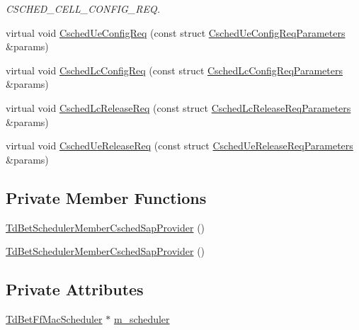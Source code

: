 \begin{DoxyCompactItemize}
\begin{DoxyCompactList}\small\item\em C\+S\+C\+H\+E\+D\+\_\+\+C\+E\+L\+L\+\_\+\+C\+O\+N\+F\+I\+G\+\_\+\+R\+EQ. \end{DoxyCompactList}\item 
virtual void \hyperlink{classns3_1_1TdBetSchedulerMemberCschedSapProvider_a410a8241454ffd4e73bf6f1985e3cb11}{Csched\+Ue\+Config\+Req} (const struct \hyperlink{structns3_1_1FfMacCschedSapProvider_1_1CschedUeConfigReqParameters}{Csched\+Ue\+Config\+Req\+Parameters} \&params)
\item 
virtual void \hyperlink{classns3_1_1TdBetSchedulerMemberCschedSapProvider_a5de5df46385608870900ff14f85d7895}{Csched\+Lc\+Config\+Req} (const struct \hyperlink{structns3_1_1FfMacCschedSapProvider_1_1CschedLcConfigReqParameters}{Csched\+Lc\+Config\+Req\+Parameters} \&params)
\item 
virtual void \hyperlink{classns3_1_1TdBetSchedulerMemberCschedSapProvider_ad422342a6a2267f209e877e2fae1b5d3}{Csched\+Lc\+Release\+Req} (const struct \hyperlink{structns3_1_1FfMacCschedSapProvider_1_1CschedLcReleaseReqParameters}{Csched\+Lc\+Release\+Req\+Parameters} \&params)
\item 
virtual void \hyperlink{classns3_1_1TdBetSchedulerMemberCschedSapProvider_a112571d55cfea2cab9f4cc0c89280a12}{Csched\+Ue\+Release\+Req} (const struct \hyperlink{structns3_1_1FfMacCschedSapProvider_1_1CschedUeReleaseReqParameters}{Csched\+Ue\+Release\+Req\+Parameters} \&params)
\end{DoxyCompactItemize}
\subsection*{Private Member Functions}
\begin{DoxyCompactItemize}
\item 
\hyperlink{classns3_1_1TdBetSchedulerMemberCschedSapProvider_a309d16ae841ae9cf6559a5d9f4ee7f9c}{Td\+Bet\+Scheduler\+Member\+Csched\+Sap\+Provider} ()
\item 
\hyperlink{classns3_1_1TdBetSchedulerMemberCschedSapProvider_a309d16ae841ae9cf6559a5d9f4ee7f9c}{Td\+Bet\+Scheduler\+Member\+Csched\+Sap\+Provider} ()
\end{DoxyCompactItemize}
\subsection*{Private Attributes}
\begin{DoxyCompactItemize}
\item 
\hyperlink{classns3_1_1TdBetFfMacScheduler}{Td\+Bet\+Ff\+Mac\+Scheduler} $\ast$ \hyperlink{classns3_1_1TdBetSchedulerMemberCschedSapProvider_a3c76a535c04f36a05acd40996f5bdf89}{m\+\_\+scheduler}
\end{DoxyCompactItemize}


